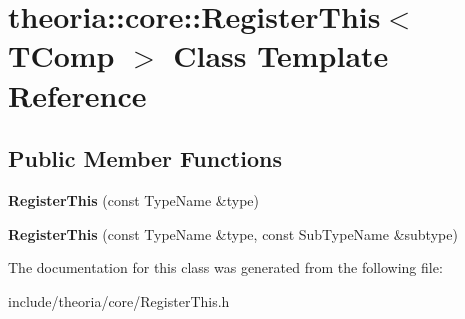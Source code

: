 \hypertarget{classtheoria_1_1core_1_1RegisterThis}{\section{theoria\+:\+:core\+:\+:Register\+This$<$ T\+Comp $>$ Class Template Reference}
\label{classtheoria_1_1core_1_1RegisterThis}
}
\subsection*{Public Member Functions}
\begin{DoxyCompactItemize}
\item 
\hypertarget{classtheoria_1_1core_1_1RegisterThis_ad736eff7aa2b6819197a839a08382f20}{{\bfseries Register\+This} (const Type\+Name \&type)}\label{classtheoria_1_1core_1_1RegisterThis_ad736eff7aa2b6819197a839a08382f20}

\item 
\hypertarget{classtheoria_1_1core_1_1RegisterThis_aec0af7608af32e2b828c7e3953af3695}{{\bfseries Register\+This} (const Type\+Name \&type, const Sub\+Type\+Name \&subtype)}\label{classtheoria_1_1core_1_1RegisterThis_aec0af7608af32e2b828c7e3953af3695}

\end{DoxyCompactItemize}


The documentation for this class was generated from the following file\+:\begin{DoxyCompactItemize}
\item 
include/theoria/core/Register\+This.\+h\end{DoxyCompactItemize}
